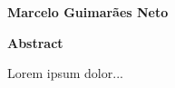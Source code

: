 \thispagestyle{plain}
\begin{center}
    \Large
    \textbf{\thtitle}
        
    \vspace{0.4cm}
    \large
	\thsubtitle

    \vspace{0.4cm}
    \textbf{Marcelo Guimarães Neto}
       
    \vspace{0.9cm}
    \textbf{Abstract}
\end{center}
Lorem ipsum dolor...
